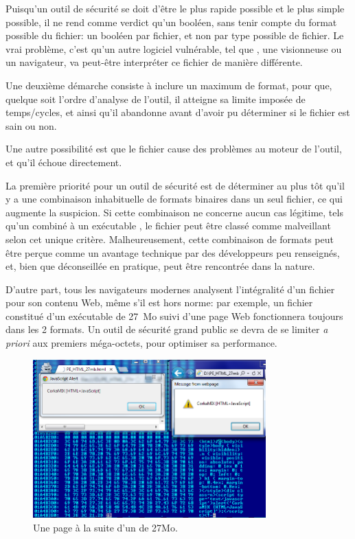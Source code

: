 Puisqu'un outil de sécurité se doit d'être le plus rapide possible et le plus simple possible, il ne rend comme verdict qu'un booléen, sans tenir compte du format possible du fichier: un booléen par fichier, et non par type possible de fichier.
Le vrai problème, c'est qu'un autre logiciel vulnérable, tel que \JAVA, une visionneuse \PDF ou un navigateur, va peut-être interpréter ce fichier de manière différente.


Une deuxième démarche consiste à inclure un maximum de format, pour que, quelque soit l'ordre d'analyse de l'outil, il atteigne sa limite imposée de temps/cycles, et ainsi qu'il abandonne avant d'avoir pu déterminer si le fichier est sain ou non.

Une autre possibilité est que le fichier cause des problèmes au moteur de l'outil, et qu'il échoue directement.

La première priorité pour un outil de sécurité est de déterminer au plus tôt qu'il y a une combinaison inhabituelle de formats binaires dans un seul fichier, ce qui augmente la suspicion. Si cette combinaison ne concerne aucun cas légitime, tels qu'un \HTML combiné à un exécutable \PE, le fichier peut être classé comme malveillant selon cet unique critère. Malheureusement, cette combinaison de formats peut être perçue comme un avantage technique par des développeurs peu renseignés, et, bien que déconseillée en pratique, peut être rencontrée dans la nature.

D'autre part, tous les navigateurs modernes analysent l'intégralité d'un fichier pour son contenu Web, même s'il est hors norme: par exemple, un fichier constitué d'un exécutable \PE de 27~Mo suivi d'une page Web fonctionnera toujours dans les 2 formats. Un outil de sécurité grand public se devra de se limiter {\it a priori} aux premiers méga-octets, pour optimiser sa performance.

\begin{figure}[ht]
  \centering
  \includegraphics[width=0.8\textwidth]{albertini/img/PE_HTML_27mb}
  \caption{Une page \HTML à la suite d'un \PE de 27Mo.}
  \label{fig:albertini:PE_HTML_27mb}
\end{figure}


